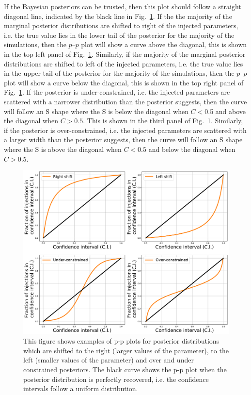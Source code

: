 If the Bayesian posteriors can be trusted, then this plot should follow a straight
diagonal line, indicated by the black line in
Fig.~\ref{par_est:results:ppplot_example}.  If the the majority of the marginal posterior
distributions are shifted to right of the injected parameters, i.e. the true value lies in
the lower tail of the posterior for the majority of the simulations, then the $p$--$p$ plot will show a curve above
the diagonal, this is shown in the top left
panel of Fig.~\ref{par_est:results:ppplot_example}.  Similarly, if the majority of the marginal posterior distributions are shifted to
left of the injected parameters, i.e. the true value
lies in the upper tail of the posterior for the majority of the simulations,
then the $p$--$p$ plot will show a curve below the diagonal, this is shown in the
top right panel of Fig.~\ref{par_est:results:ppplot_example}.  If the posterior is
under-constrained, i.e. the injected parameters are scattered with a narrower distribution than the posterior suggests, then the curve will follow an S shape
where the S is below the diagonal when $C < 0$.5 and above the diagonal when $C >
0.5$. This is shown in the third panel of
Fig.~\ref{par_est:results:ppplot_example}.  Similarly, if the posterior is over-constrained, i.e. the injected parameters are scattered with a larger width than the posterior suggests, then the curve will follow an S shape where the S is
above the diagonal when $C < 0.5$ and below the diagonal when $C> 0.5$.
%
\begin{figure}[ht]
    \centering
    \includegraphics[width=0.9\linewidth]{C5_parameter/ppplot_examples.pdf}
    \caption[$p$--$p$ plot examples]{This figure shows examples of p-p plots for
posterior distributions which are shifted to the right (larger values of the
parameter), to the left (smaller values of the parameter) and over and under
constrained posteriors. The black curve shows the p-p plot when the posterior
distribution is perfectly recovered, i.e. the confidence intervals follow a
uniform distribution.}
\label{par_est:results:ppplot_example}
\end{figure}

